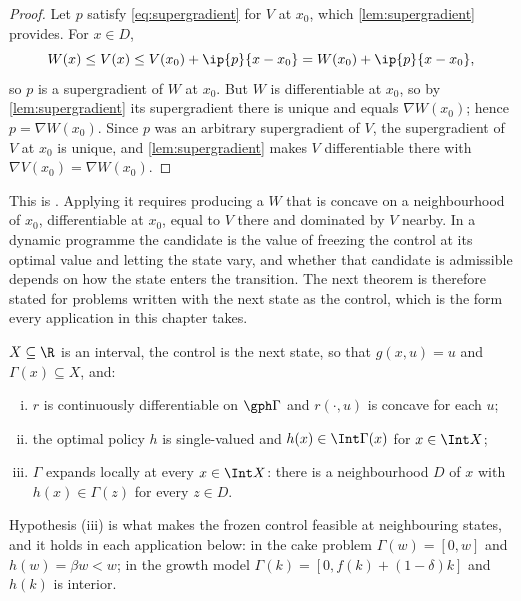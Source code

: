 \begin{proof}
	Let $p$ satisfy \eqref{eq:supergradient} for $V$ at $x_0$, which
	\autoref{lem:supergradient} provides. For $x\in D$,
	\[
		W(x)\leq V(x)\leq V(x_0)+\ip{p}{x-x_0}=W(x_0)+\ip{p}{x-x_0},
	\]
	so $p$ is a supergradient of $W$ at $x_0$. But $W$ is differentiable at $x_0$,
	so by \autoref{lem:supergradient} its supergradient there is unique and equals
	$\nabla W(x_0)$; hence $p=\nabla W(x_0)$. Since $p$ was an arbitrary
	supergradient of $V$, the supergradient of $V$ at $x_0$ is unique, and
	\autoref{lem:supergradient} makes $V$ differentiable there with
	$\nabla V(x_0)=\nabla W(x_0)$.
\end{proof}

This is \textcite{benveniste1979differentiability}. Applying it requires
producing a $W$ that is concave on a neighbourhood of $x_0$, differentiable at
$x_0$, equal to $V$ there and dominated by $V$ nearby. In a dynamic programme the
candidate is the value of freezing the control at its optimal value and letting
the state vary, and whether that candidate is admissible depends on how the state
enters the transition. The next theorem is therefore stated for problems written
with the next state as the control, which is the form every application in this
chapter takes.

\begin{assumption}\label{ass:next-state}
	$X\subseteq\R$ is an interval, the control is the next state, so that
	$g(x,u)=u$ and $\Gamma(x)\subseteq X$, and:
	\begin{enumerate}[(i)]
		\item $r$ is continuously differentiable on $\gph\Gamma$ and $r(\cdot,u)$ is
		      concave for each $u$;
		\item the optimal policy $h$ is single-valued and $h(x)\in\Int\Gamma(x)$ for
		      $x\in\Int X$;
		\item $\Gamma$ expands locally at every $x\in\Int X$: there is a
		      neighbourhood $D$ of $x$ with $h(x)\in\Gamma(z)$ for every $z\in D$.
	\end{enumerate}
\end{assumption}

Hypothesis (iii) is what makes the frozen control feasible at neighbouring
states, and it holds in each application below: in the cake problem
$\Gamma(w)=[0,w]$ and $h(w)=\beta w<w$; in the growth model
$\Gamma(k)=[0,f(k)+(1-\delta)k]$ and $h(k)$ is interior.

